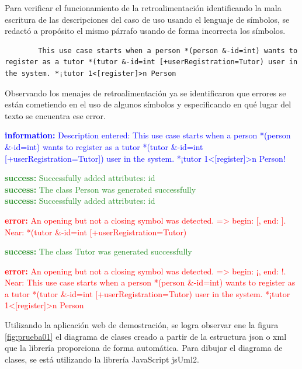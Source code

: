 \begin{itemize}
	Para verificar el funcionamiento de la retroalimentación identificando la mala escritura de las descripciones del caso de uso usando el lenguaje de símbolos, se redactó a propósito el mismo párrafo usando de forma incorrecta los símbolos.
	
	\begin{lstlisting}
		This use case starts when a person *(person &-id=int) wants to register as a tutor *(tutor &-id=int [+userRegistration=Tutor) user in the system. *¡tutor 1<[register]>n Person \end{lstlisting} 
	
	Observando los menajes de retroalimentación ya se identificaron que errores se están cometiendo en el uso de algunos símbolos y especificando en qué lugar del texto se encuentra ese error.
	
	\textcolor{blue}{\textbf{information:} Description entered: This use case starts when a person *(person \&-id=int) wants to register as a tutor *(tutor \&-id=int [+userRegistration=Tutor]) user in the system. *¡tutor 1<[register]>n Person!}
	
	\textcolor{ForestGreen}{
	\textbf{success:} Successfully added attributes: id \\
	\textbf{success:} The class Person was generated successfully \\
	\textbf{success:} Successfully added attributes: id}

	\textcolor{Red}{
	\textbf{error:} An opening but not a closing symbol was detected. => begin: [, end: ]. Near: *(tutor \&-id=int [+userRegistration=Tutor)}

	\textcolor{ForestGreen}{\textbf{success:} The class Tutor was generated successfully }
	
	\textcolor{Red}{
	\textbf{error:}  An opening but not a closing symbol was detected. => begin: ¡, end: !. Near: This use case starts when a person *(person \&-id=int) wants to register as a tutor *(tutor \&-id=int [+userRegistration=Tutor) user in the system. *¡tutor 1<[register]>n Person}

	Utilizando la aplicación web de demostración, se logra observar ene la figura \ref{fig:prueba01} el diagrama de clases creado a partir de la estructura json o xml que la librería proporciona de forma automática. Para dibujar el diagrama de clases, se está utilizando la librería JavaScript jsUml2. 
	

\end{itemize}

